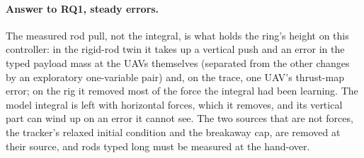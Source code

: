 \paragraph{Answer to RQ1, steady errors.} The measured rod pull, not the integral, is what holds the ring's height on
this controller: in the rigid-rod twin it takes up a vertical push and an error in the typed payload mass at the UAVs
themselves (separated from the other changes by an exploratory one-variable pair) and, on the trace, one UAV's
thrust-map error; on the rig it removed most of the force the integral had been learning.
The model integral is left with horizontal forces, which it removes, and its vertical part can wind up on an error it
cannot see. The two sources that are not forces, the tracker's relaxed initial condition and the breakaway cap, are
removed at their source, and rods typed long must be measured at the hand-over.
